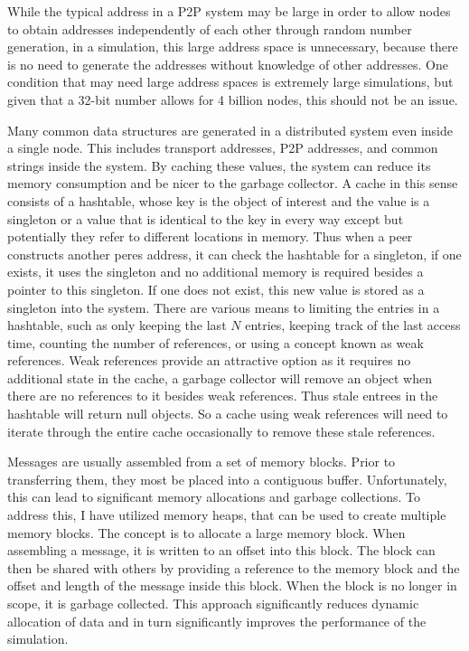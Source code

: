 While the typical address in a P2P system may be large in order to allow nodes
to obtain addresses independently of each other through random number
generation, in a simulation, this large address space is unnecessary, because
there is no need to generate the addresses without knowledge of other
addresses.  One condition that may need large address spaces is extremely large
simulations, but given that a 32-bit number allows for 4 billion nodes, this
should not be an issue.

Many common data structures are generated in a distributed system even inside a
single node.  This includes transport addresses, P2P addresses, and common
strings inside the system.  By caching these values, the system can reduce its
memory consumption and be nicer to the garbage collector.  A cache in this
sense consists of a hashtable, whose key is the object of interest and the
value is a singleton or a value that is identical to the key in every way
except but potentially they refer to different locations in memory.  Thus when
a peer constructs another peres address, it can check the hashtable for a
singleton, if one exists, it uses the singleton and no additional memory is
required besides a pointer to this singleton.  If one does not exist, this new
value is stored as a singleton into the system.  There are various means to
limiting the entries in a hashtable, such as only keeping the last $N$ entries,
keeping track of the last access time, counting the number of references, or
using a concept known as weak references.  Weak references provide an
attractive option as it requires no additional state in the cache, a garbage
collector will remove an object when there are no references to it besides weak
references.  Thus stale entrees in the hashtable will return null objects.  So
a cache using weak references will need to iterate through the entire cache
occasionally to remove these stale references.

Messages are usually assembled from a set of memory blocks.  Prior to
transferring them, they most be placed into a contiguous buffer.
Unfortunately, this can lead to significant memory allocations and garbage
collections.  To address this, I have utilized memory heaps, that can be used
to create multiple memory blocks.  The concept is to allocate a large memory
block.  When assembling a message, it is written to an offset into this block.
The block can then be shared with others by providing a reference to the memory
block and the offset and length of the message inside this block.  When the
block is no longer in scope, it is garbage collected.  This approach
significantly reduces dynamic allocation of data and in turn significantly
improves the performance of the simulation.


